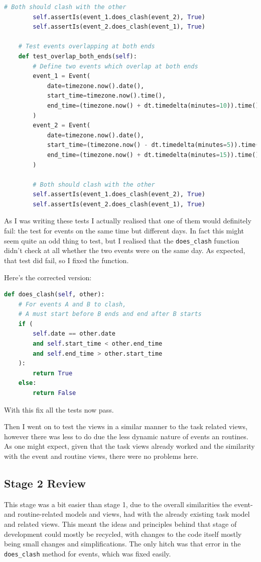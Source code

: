 \documentclass{article}
\begin{document}
\begin{lstlisting}[language=Python]
        # Both should clash with the other
        self.assertIs(event_1.does_clash(event_2), True)
        self.assertIs(event_2.does_clash(event_1), True)

    # Test events overlapping at both ends
    def test_overlap_both_ends(self):
        # Define two events which overlap at both ends
        event_1 = Event(
            date=timezone.now().date(),
            start_time=timezone.now().time(),
            end_time=(timezone.now() + dt.timedelta(minutes=10)).time(),
        )
        event_2 = Event(
            date=timezone.now().date(),
            start_time=(timezone.now() - dt.timedelta(minutes=5)).time(),
            end_time=(timezone.now() + dt.timedelta(minutes=15)).time(),
        )

        # Both should clash with the other
        self.assertIs(event_1.does_clash(event_2), True)
        self.assertIs(event_2.does_clash(event_1), True)
\end{lstlisting}

As I was writing these tests I actually realised that one of them would definitely fail:
the test for events on the same time but different days.
In fact this might seem quite an odd thing to test,
but I realised that the \texttt{does\_clash} function didn't check at all whether the two events were on the same day.
As expected, that test did fail,
so I fixed the function.

Here's the corrected version:
\begin{lstlisting}[language=Python]
def does_clash(self, other):
    # For events A and B to clash,
    # A must start before B ends and end after B starts
    if (
        self.date == other.date
        and self.start_time < other.end_time
        and self.end_time > other.start_time
    ):
        return True
    else:
        return False
\end{lstlisting}

With this fix all the tests now pass.

Then I went on to test the views in a similar manner to the task related views,
however there was less to do due the less dynamic nature of events an routines.
As one might expect,
given that the task views already worked and the similarity with the event and routine views,
there were no problems here.

\subsection{Stage 2 Review}
This stage was a bit easier than stage 1,
due to the overall similarities the event- and routine-related models and views,
had with the already existing task model and related views.
This meant the ideas and principles behind that stage of development could mostly be recycled,
with changes to the code itself mostly being small changes and simplifications.
The only hitch was that error in the \texttt{does\_clash} method for events,
which was fixed easily.
\end{document}
